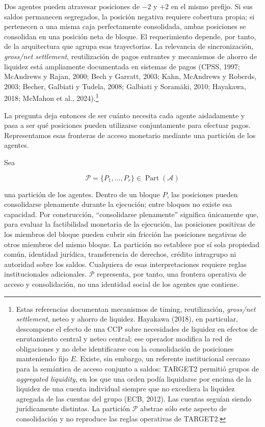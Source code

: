\documentclass[10pt,a5paper,twoside]{article}
\begin{document}
Dos agentes pueden atravesar posiciones de \(-2\) y \(+2\) en el mismo
prefijo. Si sus saldos permanecen segregados, la posición negativa requiere
cobertura propia; si pertenecen a una misma caja perfectamente consolidada,
ambas posiciones se consolidan en una posición neta de bloque. El requerimiento depende, por tanto, de la
arquitectura que agrupa esas trayectorias. La relevancia de sincronización, \emph{gross/net
settlement}, reutilización de pagos entrantes y mecanismos de ahorro de
liquidez está ampliamente documentada en sistemas de pagos (CPSS, 1997;
McAndrews y Rajan, 2000; Bech y Garratt, 2003; Kahn, McAndrews y
Roberds, 2003; Becher, Galbiati y Tudela, 2008; Galbiati y Soramäki,
2010; Hayakawa, 2018; McMahon et al., 2024).\footnote{Estas referencias documentan mecanismos de timing, reutilización,
\emph{gross/net settlement}, neteo y ahorro de liquidez. Hayakawa (2018), en
particular, descompone el efecto de una CCP sobre necesidades de liquidez en
efectos de enrutamiento central y neteo central; ese operador modifica la red
de obligaciones y no debe identificarse con la consolidación de posiciones
manteniendo fijo \(E\). Existe, sin embargo, un referente institucional cercano
para la semántica de acceso conjunto a saldos: TARGET2 permitió grupos de
\emph{aggregated liquidity}, en los que una orden podía liquidarse por encima
de la liquidez de una cuenta individual siempre que no excediera la liquidez
agregada de las cuentas del grupo (ECB, 2012). Las cuentas seguían siendo
jurídicamente distintas. La partición \(\mathcal P\) abstrae sólo este aspecto
de consolidación y no reproduce las reglas operativas de TARGET2.}

La pregunta deja entonces de ser cuánto necesita cada agente aisladamente y pasa a ser
qué posiciones pueden utilizarse conjuntamente para efectuar pagos. Representamos esas
fronteras de acceso monetario mediante una partición de los agentes.

Sea

\[
\mathcal P=\{P_1,\ldots,P_r\}\in\operatorname{Part}(\mathcal A)
\]

una partición de los agentes. Dentro de un bloque \(P\), las posiciones pueden consolidarse plenamente
durante la ejecución; entre bloques no existe esa capacidad. Por construcción,
``consolidarse plenamente'' significa únicamente que, para evaluar la factibilidad
monetaria de la ejecución, las posiciones positivas de los miembros del bloque pueden
cubrir sin fricción las posiciones negativas de otros miembros del mismo bloque. La
partición no establece por sí sola propiedad común, identidad jurídica, transferencia
de derechos, crédito intragrupo ni autoridad sobre los saldos. Cualquiera de esas
interpretaciones requiere reglas institucionales adicionales. \(\mathcal P\) representa,
por tanto, una frontera operativa de acceso y consolidación, no una identidad social de
los agentes que contiene.
\end{document}

